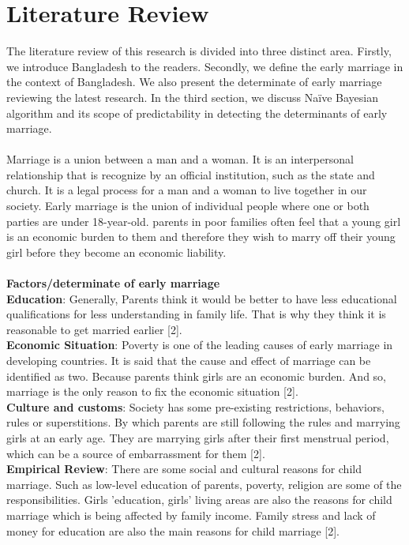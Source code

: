 \documentclass{article}
\begin{document}
\section{Literature Review}
    The literature review of this research is divided into three distinct area. Firstly, we introduce Bangladesh to the readers. Secondly, we define the early marriage in the context of Bangladesh. We also present the determinate of early marriage reviewing the latest research. In the third section, we discuss Naïve Bayesian algorithm and its scope of predictability in detecting the determinants of early marriage.\\\\
    Marriage is a union between a man and a woman. It is an interpersonal relationship that is recognize by an official institution, such as the state and church. It is a legal process for a man and a woman to live together in our society. Early marriage is the union of individual people where one or both parties are under 18-year-old. parents in poor families often feel that a young girl is an economic burden to them and therefore they wish to marry off their young girl before they become an economic liability.\\\\
    \textbf{Factors/determinate of early marriage} \\
    \textbf{Education}: Generally, Parents think it would be better to have less educational qualifications for less understanding in family life. That is why they think it is reasonable to get married earlier [2]. \\
    \textbf{Economic Situation}: Poverty is one of the leading causes of early marriage in developing countries. It is said that the cause and effect of marriage can be identified as two. Because parents think girls are an economic burden. And so, marriage is the only reason to fix the economic situation [2]. \\
    \textbf{Culture and customs}: Society has some pre-existing restrictions, behaviors, rules or superstitions. By which parents are still following the rules and marrying girls at an early age. They are marrying girls after their first menstrual period, which can be a source of embarrassment for them [2]. \\
    \textbf{Empirical Review}: There are some social and cultural reasons for child marriage. Such as low-level education of parents, poverty, religion are some of the responsibilities. Girls 'education, girls' living areas are also the reasons for child marriage which is being affected by family income. Family stress and lack of money for education are also the main reasons for child marriage [2].\\\\
\end{document}
